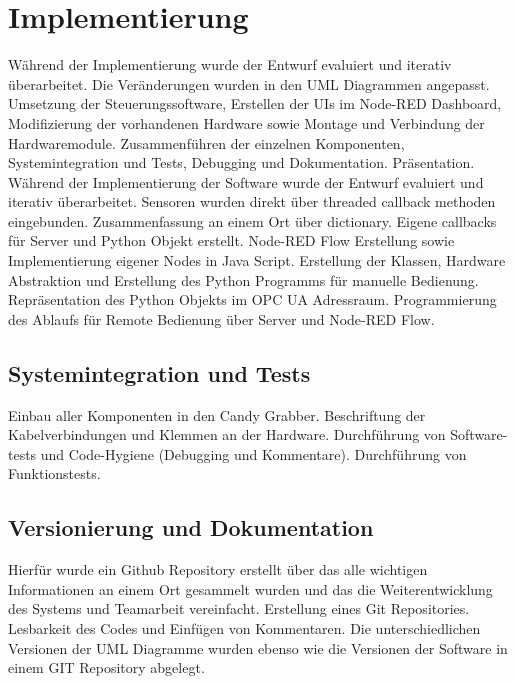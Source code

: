 \documentclass[BMR,Bachelor,ngerman]{twbook}%
\begin{document}
\section{Implementierung}
Während der Implementierung wurde der Entwurf evaluiert und iterativ überarbeitet. Die Veränderungen wurden in den UML Diagrammen angepasst. 
Umsetzung der Steuerungssoftware, Erstellen der UIs im Node-RED Dashboard, Modifizierung der vorhandenen Hardware sowie Montage und Verbindung der Hardwaremodule. Zusammenführen der einzelnen Komponenten, Systemintegration und Tests, Debugging und Dokumentation. Präsentation. Während der Implementierung der Software wurde der Entwurf evaluiert und iterativ überarbeitet.
Sensoren wurden direkt über threaded callback methoden eingebunden. Zusammenfassung an einem Ort über dictionary. Eigene callbacks für Server und Python Objekt erstellt.
Node-RED Flow Erstellung sowie Implementierung eigener Nodes in Java Script.
Erstellung der Klassen, Hardware Abstraktion und Erstellung des Python Programms für manuelle Bedienung. Repräsentation des Python Objekts im OPC UA Adressraum. Programmierung des Ablaufs für Remote Bedienung über Server und Node-RED Flow.
\subsection{Systemintegration und Tests}
Einbau aller Komponenten in den Candy Grabber. Beschriftung der Kabelverbindungen und Klemmen an der Hardware. Durchführung von Software-tests und Code-Hygiene (Debugging und Kommentare). Durchführung von Funktionstests.
\subsection{Versionierung und Dokumentation}
Hierfür wurde ein Github Repository erstellt über das alle wichtigen Informationen an einem Ort gesammelt wurden und das die Weiterentwicklung des Systems und Teamarbeit vereinfacht.
Erstellung eines Git Repositories. Lesbarkeit des Codes und Einfügen von Kommentaren. Die unterschiedlichen Versionen der UML Diagramme wurden ebenso wie die Versionen der Software in einem GIT Repository abgelegt.
%
\clearpage
\end{document}
